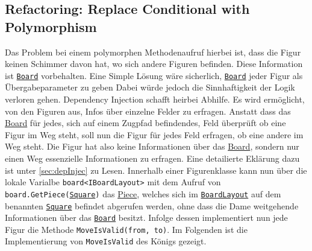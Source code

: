 \documentclass[
10pt, %
a4paper, %
oneside, %
headinclude,footinclude, %
BCOR5mm, %
]{scrartcl}
\begin{document}
\begin{onehalfspace}
\subsection{Refactoring: Replace Conditional with Polymorphism}
Das Problem bei einem polymorphen Methodenaufruf hierbei ist, dass die Figur keinen Schimmer davon hat, wo sich andere Figuren befinden. Diese Information ist \texttt{\href{https://github.com/schmida736/Chess-AdvancedSE/blob/main/Chess-AdvancedSE/Game\%20Elements/Board.cs}{Board}} vorbehalten. Eine Simple Lösung wäre sicherlich, \texttt{\href{https://github.com/schmida736/Chess-AdvancedSE/blob/main/Chess-AdvancedSE/Game\%20Elements/Board.cs}{Board}} jeder Figur als Übergabeparameter zu geben Dabei würde jedoch die Sinnhaftigkeit der Logik verloren gehen. Dependency Injection schafft heirbei Abhilfe. Es wird ermöglicht, von den Figuren aus, Infos über einzelne Felder zu erfragen. Anstatt dass das \href{https://github.com/schmida736/Chess-AdvancedSE/blob/main/Chess-AdvancedSE/Game\%20Elements/Board.cs}{Board} für jedes, sich auf einem Zugpfad befindendes, Feld überprüft ob eine Figur im Weg steht, soll nun die Figur für jedes Feld erfragen, ob eine andere im Weg steht. Die Figur hat also keine Informationen über das \href{https://github.com/schmida736/Chess-AdvancedSE/blob/main/Chess-AdvancedSE/Game\%20Elements/Board.cs}{Board}, sondern nur einen Weg essenzielle Informationen zu erfragen. Eine detailierte Eklärung dazu ist unter \autoref{sec:depInjec} zu Lesen. Innerhalb einer Figurenklasse kann nun über die lokale Varialbe \texttt{board<IBoardLayout>} mit dem Aufruf von  \texttt{board.GetPiece(\href{https://github.com/schmida736/Chess-AdvancedSE/blob/main/Chess-AdvancedSE/Game\%20Elements/Square.cs}{Square})} das \href{https://github.com/schmida736/Chess-AdvancedSE/blob/main/Chess-AdvancedSE/Game\%20Elements/Pieces/Piece.cs}{Piece}, welches sich im \texttt{\href{https://github.com/schmida736/Chess-AdvancedSE/blob/main/Chess-AdvancedSE/Game\%20Elements/BoardLayout.cs}{BoardLayout}} auf dem benannten \texttt{\href{https://github.com/schmida736/Chess-AdvancedSE/blob/main/Chess-AdvancedSE/Game\%20Elements/Square.cs}{Square}} befindet abgerufen werden, ohne dass die Dame weitgehende Informationen über das \texttt{\href{https://github.com/schmida736/Chess-AdvancedSE/blob/main/Chess-AdvancedSE/Game\%20Elements/Board.cs}{Board}} besitzt.
Infolge dessen implementiert nun jede Figur die Methode \texttt{MoveIsValid(from, to)}. Im Folgenden ist die Implementierung von \texttt{MoveIsValid} des Königs gezeigt.


\end{onehalfspace}
\end{document}
